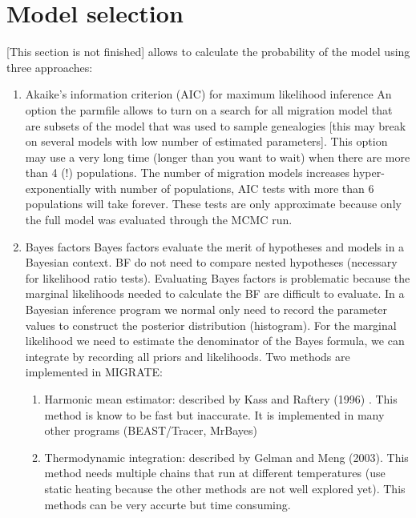\chapter{Model selection}
[This section is not finished] \migrate allows to calculate the probability of the model using three approaches:
\begin{enumerate}
  \item Akaike's information criterion (AIC) for maximum likelihood inference
 An option the parmfile allows to turn on a search for all migration model that are subsets of the model that was used to sample genealogies [this may break on several models with low number of estimated parameters]. 
This option may use a very long time (longer than you want to wait) when there are more than 4 (!) populations. The number of migration models increases hyper-exponentially with number of populations, AIC tests with more than 6 populations will take forever. These tests are only approximate because only the full model was evaluated through the MCMC run. 
 
  \item Bayes factors
  Bayes factors evaluate the merit of hypotheses and models in a Bayesian context. BF do not need to compare nested hypotheses (necessary for likelihood ratio tests). Evaluating Bayes factors is problematic because the marginal likelihoods needed to calculate the BF are difficult to evaluate. In a Bayesian inference program we normal only need to record the parameter values to construct the posterior distribution (histogram). For the marginal likelihood we need to estimate the denominator of the Bayes formula, we can integrate by recording all priors and likelihoods. Two methods are implemented in MIGRATE:
 \begin{enumerate}
  \item Harmonic mean estimator: described by Kass and Raftery (1996) . This method is know to be fast but inaccurate. It is implemented in many other programs (BEAST/Tracer, MrBayes)
  \item Thermodynamic integration: described by Gelman and Meng (2003). This method needs multiple chains that run at different temperatures (use static heating because the other methods are not well explored yet). This methods can be very accurte but time consuming.
\end{enumerate}
\end{enumerate}
